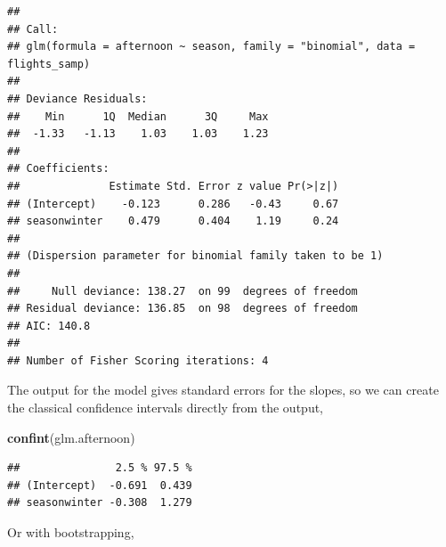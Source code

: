 \documentclass[]{book}
\newenvironment{Shaded}{\begin{snugshade}}{\end{snugshade}}
\newcommand{\CommentTok}[1]{\textcolor[rgb]{0.56,0.35,0.01}{\textit{#1}}}
\newcommand{\DataTypeTok}[1]{\textcolor[rgb]{0.13,0.29,0.53}{#1}}
\newcommand{\DecValTok}[1]{\textcolor[rgb]{0.00,0.00,0.81}{#1}}
\newcommand{\KeywordTok}[1]{\textcolor[rgb]{0.13,0.29,0.53}{\textbf{#1}}}
\newcommand{\NormalTok}[1]{#1}
\newcommand{\OperatorTok}[1]{\textcolor[rgb]{0.81,0.36,0.00}{\textbf{#1}}}
\newcommand{\OtherTok}[1]{\textcolor[rgb]{0.56,0.35,0.01}{#1}}
\newcommand{\StringTok}[1]{\textcolor[rgb]{0.31,0.60,0.02}{#1}}
\begin{document}
\begin{verbatim}
## 
## Call:
## glm(formula = afternoon ~ season, family = "binomial", data = flights_samp)
## 
## Deviance Residuals: 
##    Min      1Q  Median      3Q     Max  
##  -1.33   -1.13    1.03    1.03    1.23  
## 
## Coefficients:
##              Estimate Std. Error z value Pr(>|z|)
## (Intercept)    -0.123      0.286   -0.43     0.67
## seasonwinter    0.479      0.404    1.19     0.24
## 
## (Dispersion parameter for binomial family taken to be 1)
## 
##     Null deviance: 138.27  on 99  degrees of freedom
## Residual deviance: 136.85  on 98  degrees of freedom
## AIC: 140.8
## 
## Number of Fisher Scoring iterations: 4
\end{verbatim}

The output for the model gives standard errors for the slopes, so we can create the classical confidence intervals directly from the output,

\begin{Shaded}
\begin{Highlighting}[]
\KeywordTok{confint}\NormalTok{(glm.afternoon)}
\end{Highlighting}
\end{Shaded}

\begin{verbatim}
##               2.5 % 97.5 %
## (Intercept)  -0.691  0.439
## seasonwinter -0.308  1.279
\end{verbatim}

Or with bootstrapping,

\begin{Shaded}
\end{Shaded}
\end{document}
